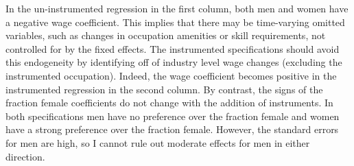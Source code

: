 \documentclass[12pt]{article}
\begin{document}
In the un-instrumented regression in the first column, both men and women have a negative wage coefficient. This implies that there may be time-varying omitted variables, such as changes in occupation amenities or skill requirements, not controlled for by the fixed effects. The instrumented specifications should avoid this endogeneity by identifying off of industry level wage changes (excluding the instrumented occupation). Indeed, the wage coefficient becomes positive in the instrumented regression in the second column. By contrast, the signs of the fraction female coefficients do not change with the addition of instruments. In both specifications men have no preference over the fraction female and women have a strong preference over the fraction female. However, the standard errors for men are high, so I cannot rule out moderate effects for men in either direction. 












\end{document}
